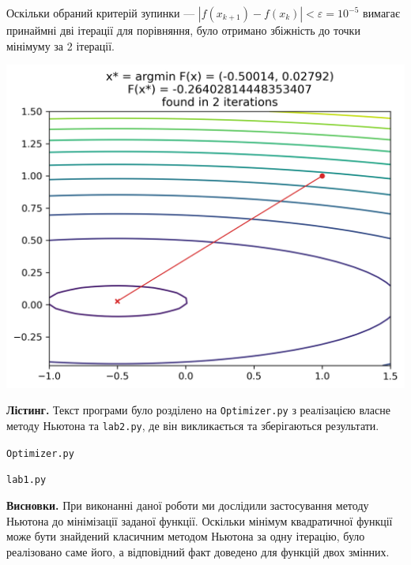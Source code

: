 \documentclass{extreport}
\begin{document}
Оскільки обраний критерій зупинки --- $\left| f(x_{k+1}) - f(x_k)\right| < \varepsilon = 10^{-5}$
вимагає принаймні дві ітерації для порівняння, було отримано збіжність до точки мінімуму за 2 ітерації.
\begin{center}
    \includegraphics[scale = 0.8]{contour_final.png}
\end{center}

\noindent\textbf{Лістинг.}
Текст програми було розділено на \texttt{Optimizer.py} з реалізацією
власне методу Ньютона та \texttt{lab2.py}, де він викликається та зберігаються результати.

\noindent\texttt{Optimizer.py}


\noindent\texttt{lab1.py}


\noindent\textbf{Висновки.} При виконанні даної роботи ми дослідили
застосування методу Ньютона до мінімізації заданої функції.
Оскільки мінімум квадратичної функції може бути знайдений класичним методом Ньютона
за одну ітерацію, було реалізовано саме його, а відповідний факт доведено для функцій двох змінних.
\end{document}
